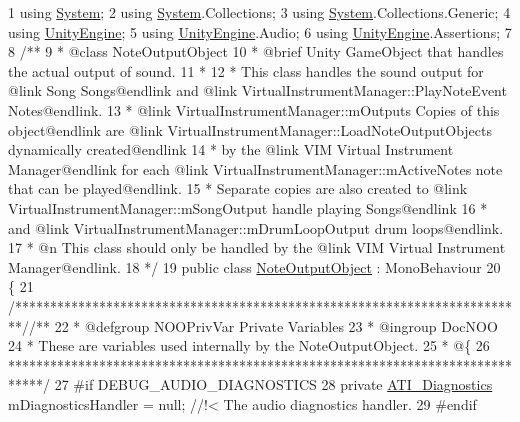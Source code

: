 \begin{DoxyCodeInclude}
1 \textcolor{keyword}{using} \hyperlink{namespace_system}{System};
2 \textcolor{keyword}{using} \hyperlink{namespace_system}{System}.Collections;
3 \textcolor{keyword}{using} \hyperlink{namespace_system}{System}.Collections.Generic;
4 \textcolor{keyword}{using} \hyperlink{namespace_unity_engine}{UnityEngine};
5 \textcolor{keyword}{using} \hyperlink{namespace_unity_engine}{UnityEngine}.Audio;
6 \textcolor{keyword}{using} \hyperlink{namespace_unity_engine}{UnityEngine}.Assertions;
7 \textcolor{comment}{}
8 \textcolor{comment}{/**}
9 \textcolor{comment}{ * @class NoteOutputObject}
10 \textcolor{comment}{ * @brief Unity GameObject that handles the actual output of sound.}
11 \textcolor{comment}{ * }
12 \textcolor{comment}{ * This class handles the sound output for @link Song Songs@endlink and @link
       VirtualInstrumentManager::PlayNoteEvent Notes@endlink.}
13 \textcolor{comment}{ * @link VirtualInstrumentManager::mOutputs Copies of this object@endlink are @link
       VirtualInstrumentManager::LoadNoteOutputObjects dynamically created@endlink }
14 \textcolor{comment}{ * by the @link VIM Virtual Instrument Manager@endlink for each @link
       VirtualInstrumentManager::mActiveNotes note that can be played@endlink.}
15 \textcolor{comment}{ * Separate copies are also created to @link VirtualInstrumentManager::mSongOutput handle playing
       Songs@endlink}
16 \textcolor{comment}{ * and @link VirtualInstrumentManager::mDrumLoopOutput drum loops@endlink.}
17 \textcolor{comment}{ * @n This class should only be handled by the @link VIM Virtual Instrument Manager@endlink.}
18 \textcolor{comment}{*/}
19 \textcolor{keyword}{public} \textcolor{keyword}{class }\hyperlink{class_note_output_object}{NoteOutputObject} : MonoBehaviour
20 \{
21     \textcolor{comment}{/*************************************************************************/}\textcolor{comment}{/** }
22 \textcolor{comment}{    * @defgroup NOOPrivVar Private Variables}
23 \textcolor{comment}{    * @ingroup DocNOO}
24 \textcolor{comment}{    * These are variables used internally by the NoteOutputObject.}
25 \textcolor{comment}{    * @\{}
26 \textcolor{comment}{    *****************************************************************************/}
27 \textcolor{preprocessor}{    #if DEBUG\_AUDIO\_DIAGNOSTICS}
28         \textcolor{keyword}{private} \hyperlink{group___audio_testing_class_a_t_i___diagnostics}{ATI\_Diagnostics} mDiagnosticsHandler = null; \textcolor{comment}{//!< The audio diagnostics
       handler.}
29 \textcolor{comment}{}\textcolor{preprocessor}{    #endif}

\end{DoxyCodeInclude}
